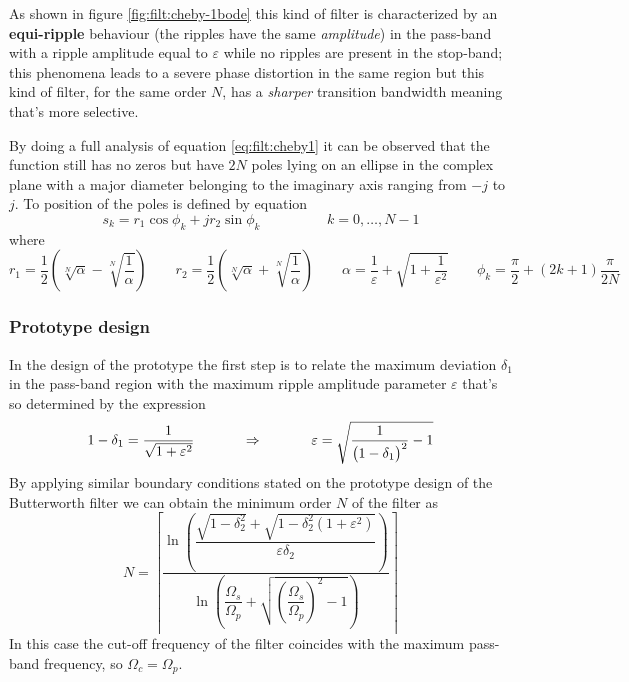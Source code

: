 		As shown in figure \ref{fig:filt:cheby-1bode} this kind of filter is characterized by an \textbf{equi-ripple} behaviour (the ripples have the same \textit{amplitude}) in the pass-band with a ripple amplitude equal to $\varepsilon$ while no ripples are present in the stop-band; this phenomena leads to a severe phase distortion in the same region but this kind of filter, for the same order $N$, has a \textit{sharper} transition bandwidth meaning that's more selective.
		
		By doing a full analysis of equation \ref{eq:filt:cheby1} it can be observed that the function still has no zeros but have $2N$ poles lying on an ellipse in the complex plane with a major diameter belonging to the imaginary axis ranging from $-j$ to $j$. To position of the poles is defined by equation
		\begin{equation}
			s_k = r_1 \cos\phi_k + j r_2 \sin\phi_k \hspace{2cm} k = 0,\dots, N-1
		\end{equation}
		where
		\[ r_1 = \frac 1 2 \left( \sqrt[N]\alpha - \sqrt[N]{\frac 1 \alpha} \right) \qquad r_2 = \frac 1 2 \left( \sqrt[N]\alpha + \sqrt[N]{\frac 1 \alpha} \right) \qquad \alpha = \frac 1 \varepsilon + \sqrt{1 + \frac{1}{\varepsilon^2}} \qquad \phi_k = \frac \pi 2 + (2k+1) \frac \pi {2N} \]
	
		\subsubsection{Prototype design}
		In the design of the prototype the first step is to relate the maximum deviation $\delta_1$ in the pass-band region with the maximum ripple amplitude parameter $\varepsilon$ that's so determined by the expression
		\begin{equation}
			1 - \delta_1 = \frac{1}{\sqrt{1+\varepsilon^2}} \hspace{1.2cm} \Rightarrow \hspace{1.2cm} \varepsilon = \sqrt{\frac 1 {\big(1-\delta_1\big)^2} - 1}
		\end{equation}
		By applying similar boundary conditions stated on the prototype design of the Butterworth filter we can obtain the minimum order $N$ of the filter as
		\begin{equation}
			N = \left\lceil \frac{\ln\left( \dfrac{\sqrt{1-\delta_2^2} + \sqrt{1-\delta_2^2(1+\varepsilon^2)}}{\varepsilon\delta_2} \right)}{\ln\left( \dfrac{\Omega_s}{\Omega_p} + \sqrt{\left( \dfrac{\Omega_s}{\Omega_p} \right)^2 - 1} \right)} \right\rceil
		\end{equation}
		In this case the cut-off frequency of the filter coincides with the maximum pass-band frequency, so $\Omega_c=  \Omega_p$.
	
